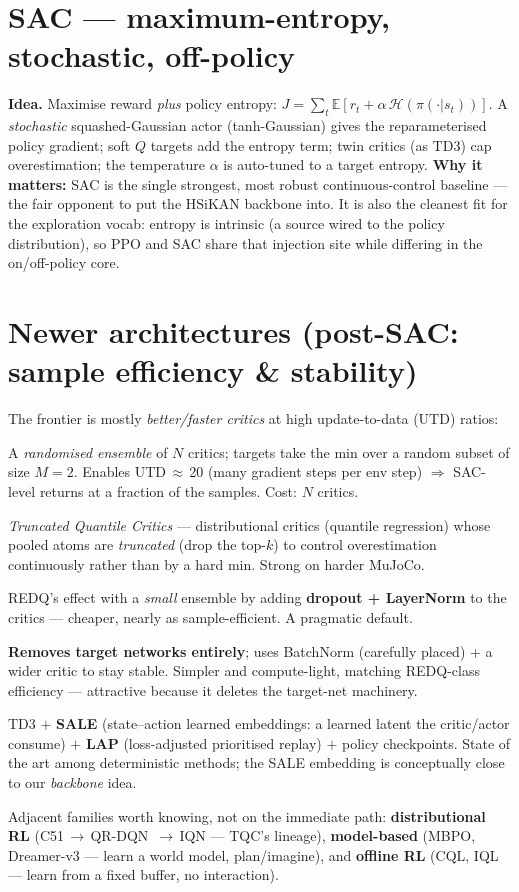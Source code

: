 \documentclass[11pt]{article}
\begin{document}
\section{SAC --- maximum-entropy, stochastic, off-policy}
\textbf{Idea.} Maximise reward \emph{plus} policy entropy: $J = \sum_t \mathbb{E}[r_t + \alpha\,
\mathcal{H}(\pi(\cdot|s_t))]$. A \emph{stochastic} squashed-Gaussian actor (tanh-Gaussian) gives the
reparameterised policy gradient; soft $Q$ targets add the entropy term; twin critics (as TD3) cap
overestimation; the temperature $\alpha$ is auto-tuned to a target entropy. \textbf{Why it matters:} SAC is the
single strongest, most robust continuous-control baseline --- the fair opponent to put the HSiKAN backbone into.
It is also the cleanest fit for the exploration vocab: entropy is intrinsic (a source wired to the policy
distribution), so PPO and SAC share that injection site while differing in the on/off-policy core.

\section{Newer architectures (post-SAC: sample efficiency \& stability)}
The frontier is mostly \emph{better/faster critics} at high update-to-data (UTD) ratios:
\begin{description}[nosep,leftmargin=1.0cm]
  \item[REDQ (2021).] A \emph{randomised ensemble} of $N$ critics; targets take the min over a random subset
        of size $M{=}2$. Enables UTD$\,\approx\,$20 (many gradient steps per env step) $\Rightarrow$ SAC-level
        returns at a fraction of the samples. Cost: $N$ critics.
  \item[TQC (2020).] \emph{Truncated Quantile Critics} --- distributional critics (quantile regression) whose
        pooled atoms are \emph{truncated} (drop the top-$k$) to control overestimation continuously rather than
        by a hard min. Strong on harder MuJoCo.
  \item[DroQ (2021).] REDQ's effect with a \emph{small} ensemble by adding \textbf{dropout + LayerNorm} to the
        critics --- cheaper, nearly as sample-efficient. A pragmatic default.
  \item[CrossQ (2024).] \textbf{Removes target networks entirely}; uses BatchNorm (carefully placed) + a wider
        critic to stay stable. Simpler and compute-light, matching REDQ-class efficiency --- attractive because
        it deletes the target-net machinery.
  \item[TD7 (2023).] TD3 $+$ \textbf{SALE} (state--action learned embeddings: a learned latent the critic/actor
        consume) $+$ \textbf{LAP} (loss-adjusted prioritised replay) $+$ policy checkpoints. State of the art
        among deterministic methods; the SALE embedding is conceptually close to our \emph{backbone} idea.
\end{description}
Adjacent families worth knowing, not on the immediate path: \textbf{distributional RL} (C51\,$\to$\,QR-DQN\,
$\to$\,IQN --- TQC's lineage), \textbf{model-based} (MBPO, Dreamer-v3 --- learn a world model, plan/imagine),
and \textbf{offline RL} (CQL, IQL --- learn from a fixed buffer, no interaction).
\end{document}
